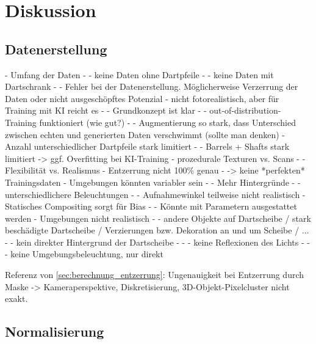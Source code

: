 
\chapter{Diskussion}
\label{cha:diskussion}


\section{Datenerstellung}
\label{sec:diskussion:daten}

- Umfang der Daten
- - keine Daten ohne Dartpfeile
- - keine Daten mit Dartschrank
- - Fehler bei der Datenerstellung. Möglicherweise Verzerrung der Daten oder nicht ausgeschöpftes Potenzial
- nicht fotorealistisch, aber für Training mit KI reicht es
- - Grundkonzept ist klar
- - out-of-distribution-Training funktioniert (wie gut?)
- - Augmentierung so stark, dass Unterschied zwischen echten und generierten Daten verschwimmt (sollte man denken)
- Anzahl unterschiedlicher Dartpfeile stark limitiert
- - Barrels + Shafts stark limitiert -> ggf. Overfitting bei KI-Training
- prozedurale Texturen vs. Scans
- - Flexibilität vs. Realismus
- Entzerrung nicht 100\% genau
- -> keine *perfekten* Trainingsdaten
- Umgebungen könnten variabler sein
- - Mehr Hintergründe
- - unterschiedlichere Beleuchtungen
- - Aufnahmewinkel teilweise nicht realistisch
- Statisches Compositing sorgt für Bias
- - Könnte mit Parametern ausgestattet werden
- Umgebungen nicht realistisch
- - andere Objekte auf Dartscheibe / stark beschädigte Dartscheibe / Verzierungen bzw. Dekoration an und um Scheibe / ...
- - kein direkter Hintergrund der Dartscheibe
- - - keine Reflexionen des Lichts
- - - keine Umgebungsbeleuchtung, nur direkt

Referenz von \autoref{sec:berechnung_entzerrung}: Ungenauigkeit bei Entzerrung durch Maske -> Kameraperspektive, Diskretisierung, 3D-Objekt-Pixelcluster nicht exakt.


\section{Normalisierung}
\label{sec:diskussion:cv}


